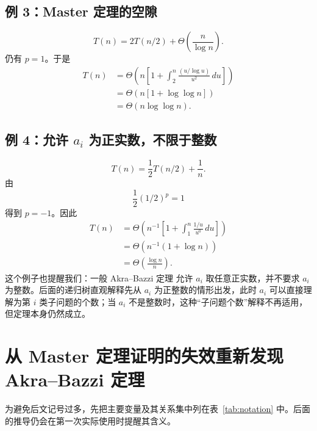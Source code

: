 \documentclass[11pt,a4paper]{article}
\newcommand{\AB}{Akra--Bazzi 定理}
\begin{document}
\subsection{例 3：Master 定理的空隙}
\begin{equation}
T(n)=2T(n/2)+\Theta\!\left(\frac{n}{\log n}\right).
\end{equation}
仍有 $p=1$。于是
\begin{align}
T(n)
&=\Theta\!\left(n\left[1+\int_2^n
\frac{(u/\log u)}{u^2}\,du\right]\right)\\
&=\Theta\!\left(n\left[1+\log\log n\right]\right)\\
&=\Theta(n\log\log n).
\end{align}

\subsection{例 4：允许 $a_i$ 为正实数，不限于整数}
\begin{equation}
T(n)=\frac12 T(n/2)+\frac1n.
\end{equation}
由
\[
\frac12(1/2)^p=1
\]
得到 $p=-1$。因此
\begin{align}
T(n)
&=\Theta\!\left(n^{-1}\left[1+\int_1^n\frac{1/u}{u^0}\,du\right]\right)\\
&=\Theta\!\left(n^{-1}(1+\log n)\right)\\
&=\Theta\!\left(\frac{\log n}{n}\right).
\end{align}
这个例子也提醒我们：一般 \AB{} 允许 $a_i$ 取任意正实数，并不要求 $a_i$ 为整数。后面的递归树直观解释先从 $a_i$ 为正整数的情形出发，此时 $a_i$ 可以直接理解为第 $i$ 类子问题的个数；当 $a_i$ 不是整数时，这种“子问题个数”解释不再适用，但定理本身仍然成立。

\section{从 Master 定理证明的失效重新发现 Akra--Bazzi 定理}

为避免后文记号过多，先把主要变量及其关系集中列在表~\ref{tab:notation} 中。后面的推导仍会在第一次实际使用时提醒其含义。
\end{document}
